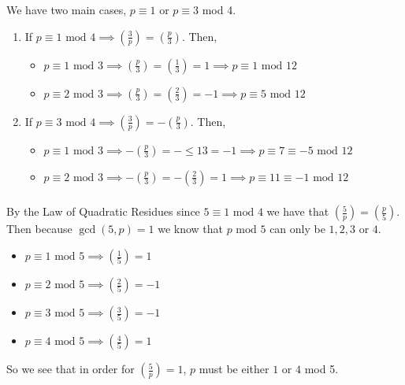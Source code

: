 \documentclass[class=article, crop=false]{standalone}
\def\leg#1#2{\left(\frac{#1}{#2}\right)}
\begin{document}
\subsubsection{}
We have two main cases, $p\equiv 1$ or $p\equiv 3$ mod 4.
  \begin{enumerate}[1.]
    \item If $p\equiv 1\mbox{ mod }4 \implies \leg{3}{p}=\leg{p}{3}$. Then,
    \begin{itemize}
      \item $p\equiv 1\mbox{ mod }3\implies \leg{p}{3}=\leg{1}{3}=1\implies p\equiv 1\mbox{ mod }12$
      \item $p\equiv 2\mbox{ mod }3\implies \leg{p}{3}=\leg{2}{3}=-1\implies p\equiv 5\mbox{ mod }12$
    \end{itemize}
    \item If $p\equiv 3\mbox{ mod }4 \implies \leg{3}{p}=-\leg{p}{3}$. Then,
    \begin{itemize}
      \item $p\equiv 1\mbox{ mod }3\implies -\leg{p}{3}=-\leq{1}{3}=-1\implies p\equiv 7\equiv -5\mbox{ mod }12$
      \item $p\equiv 2\mbox{ mod }3\implies -\leg{p}{3}=-\leg{2}{3}=1\implies p\equiv 11\equiv -1\mbox{ mod }12$
    \end{itemize}
  \end{enumerate}

\subsubsection{}
By the Law of Quadratic Residues since $5\equiv 1\mbox{ mod }4$ we have that $\leg{5}{p}=\leg{p}{5}$.
  Then because $\gcd(5,p)=1$ we know that $p\mbox{ mod }5$ can only be $1,2,3$ or $4$.
  \begin{itemize}
    \item $p\equiv 1\mbox{ mod }5\implies \leg{1}{5} = 1$
    \item $p\equiv 2\mbox{ mod }5\implies \leg{2}{5} = -1$
    \item $p\equiv 3\mbox{ mod }5\implies \leg{3}{5} = -1$
    \item $p\equiv 4\mbox{ mod }5\implies \leg{4}{5} = 1$
  \end{itemize}
  So we see that in order for $\leg{5}{p}=1$, $p$ must be either $1$ or $4$ mod 5.
\end{document}
